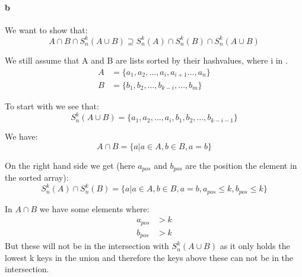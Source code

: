 \paragraph{b}

We want to show that:
\begin{equation}\label{eq:4b}
    A \cap B \cap S^{k}_{n}(A \cup B) \supseteq S^{k}_{n}(A) \cap S^{k}_{n}(B) \cap S^{k}_{n}(A \cup B)
\end{equation}

We still assume that A and B are lists sorted by their hashvalues, where i in .
\begin{align*}
    A &=\{a_1, a_2, \dots , a_{i}, a_{i+1} \dots  , a_n\}\\
    B &=\{b_1, b_2, \dots , b_{k-i}, \dots , b_m\}
\end{align*}

To start with we see that:
\begin{equation*}
    S^{k}_{n}(A\cup B) =\{a_1, a_2, \dots , a_{i}, b_1, b_2, \dots , b_{k-i-1}\}
\end{equation*}

We have:
\begin{equation*}
    A \cap B = \{ a | a \in A, b \in B, a = b\}
\end{equation*}

On the right hand side we get (here $a_{pos}$ and $b_{pos}$ are the position the element
in the sorted array):
\begin{equation*}
    S^{k}_{n}(A) \cap S^{k}_{n}(B) = \{a | a \in A, b \in B, a = b, a_{pos} \le k, b_{pos} \le k\}
\end{equation*}

In $A \cap B$ we have some elements where:
\begin{align*}
    a_{pos} & > k \\
    b_{pos} & > k
\end{align*}
But these will not be in the intersection with $S^{k}_{n}(A \cup B)$ as it only
holds the lowest k keys in the union and therefore the keys above these can not
be in the intersection.
